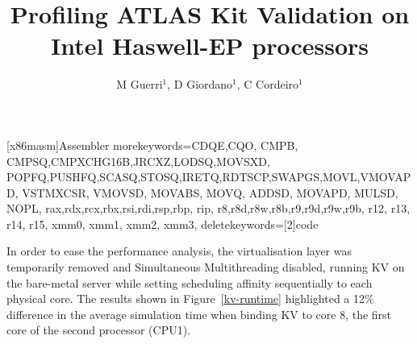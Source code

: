 \documentclass[a4paper]{jpconf}
\begin{document}
\title{Profiling ATLAS Kit Validation on \newline Intel Haswell-EP processors}

\author{M Guerri$^1$, D Giordano$^1$, C Cordeiro$^1$}
\address{$^1$ CERN}


   [x86masm]{Assembler}
   {morekeywords={CDQE,CQO, CMPB, CMPSQ,CMPXCHG16B,JRCXZ,LODSQ,MOVSXD,
                  POPFQ,PUSHFQ,SCASQ,STOSQ,IRETQ,RDTSCP,SWAPGS,MOVL,VMOVAPD,
                  VSTMXCSR, VMOVSD, MOVABS, MOVQ, ADDSD, MOVAPD, MULSD, NOPL,
                  rax,rdx,rcx,rbx,rsi,rdi,rsp,rbp, rip,
                  r8,r8d,r8w,r8b,r9,r9d,r9w,r9b, r12, r13, r14, r15,
                  xmm0, xmm1, xmm2, xmm3},
    deletekeywords=[2]{code}
    }
\newcommand\realnumberstyle[1]{}

\makeatletter
\newcommand{\zebra}[3]{%
    {\realnumberstyle{#3}}%
    \begingroup
    \lst@basicstyle
    \ifodd\value{lstnumber}%
        \color{#1}%
    \else
        \color{#2}%
    \fi
        \rlap{\hspace*{\lst@numbersep}%
        \color@block{\linewidth}{\ht\strutbox}{\dp\strutbox}%
        }%
    \endgroup
}
\makeatother




In order to ease the performance analysis, the virtualisation layer was
temporarily removed and Simultaneous Multithreading disabled, running KV on 
the bare-metal server while setting scheduling affinity sequentially to each physical
core. The results shown
in Figure~\ref{kv-runtime} highlighted a 12\% difference in the average simulation
time when binding KV to core 8, the first core of the second processor (CPU1).
\end{document}

